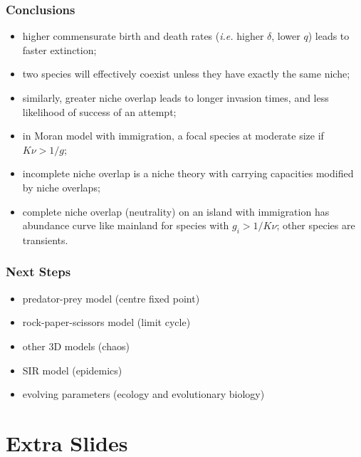 \documentclass{beamer}
\begin{document}
\begin{frame}
\frametitle{Conclusions}
\begin{itemize}
	\item higher commensurate birth and death rates (\emph{i.e.} higher $\delta$, lower $q$) leads to faster extinction; 
	\pause
	\item two species will effectively coexist unless they have exactly the same niche; 
	\pause
	\item similarly, greater niche overlap leads to longer invasion times, and less likelihood of success of an attempt; 
	\pause
	\item in Moran model with immigration, a focal species at moderate size if $K\nu > 1/g$; 
	\pause
	\item incomplete niche overlap is a niche theory with carrying capacities modified by niche overlaps;
	\item complete niche overlap (neutrality) on an island with immigration has abundance curve like mainland for species with $g_i>1/K\nu$; other species are transients. 
\end{itemize}
\end{frame}


\begin{frame}
\frametitle{Next Steps}
\begin{itemize}
	\item predator-prey model (centre fixed point)
	\pause
	\item rock-paper-scissors model (limit cycle)
	\pause
	\item other 3D models (chaos)
	\pause
	\item SIR model (epidemics)
	\pause
	\item evolving parameters (ecology and evolutionary biology)
\end{itemize}
\end{frame}



\section*{Extra Slides}
\end{document}
